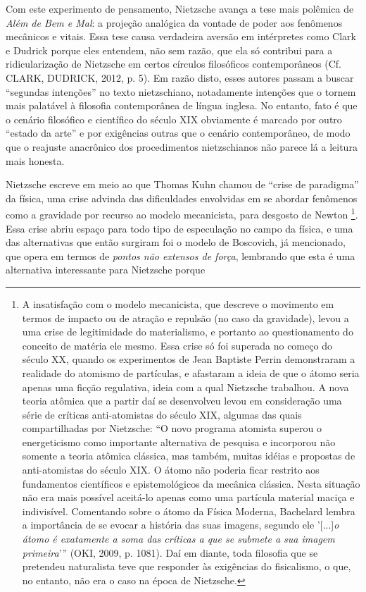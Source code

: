 \documentclass[
	12pt,				%
	openright,			%
	oneside,			%
	a4paper,			%
	english,			%
	french,				%
	spanish,			%
	brazil				%
	]{abntex2}
\begin{document}
Com este experimento de pensamento, Nietzsche avança a tese mais polêmica de \textit{Além de Bem e Mal}: a projeção analógica da vontade de poder aos fenômenos mecânicos e vitais. Essa tese causa verdadeira aversão em intérpretes como Clark e Dudrick porque eles entendem, não sem razão, que ela só contribui para a ridicularização de Nietzsche em certos círculos filosóficos contemporâneos (Cf. CLARK, DUDRICK, 2012, p. 5). Em razão disto, esses autores passam a buscar “segundas intenções” no texto nietzschiano, notadamente intenções que o tornem mais palatável à filosofia contemporânea de língua inglesa. No entanto, fato é que o cenário filosófico e científico do século XIX obviamente é marcado por outro “estado da arte” e por  exigências outras que o cenário contemporâneo, de modo que o reajuste anacrônico dos procedimentos nietzschianos não parece lá a leitura mais honesta.

	Nietzsche escreve em meio ao que Thomas Kuhn chamou de “crise de paradigma” da física, uma crise advinda das dificuldades envolvidas em se abordar fenômenos como a gravidade por recurso ao modelo mecanicista, para desgosto de Newton
\footnote{A insatisfação com o modelo mecanicista, que descreve o movimento em termos de impacto ou de atração e repulsão (no caso da gravidade), levou a uma crise de legitimidade do materialismo, e portanto ao questionamento do conceito de matéria ele mesmo. Essa crise só foi superada no começo do século XX, quando os experimentos de Jean Baptiste Perrin demonstraram a realidade do atomismo de partículas, e afastaram a ideia de que o átomo seria apenas uma ficção regulativa, ideia com a qual Nietzsche trabalhou. A nova teoria atômica que a partir daí se desenvolveu levou em consideração uma série de críticas anti-atomistas do século XIX, algumas das quais compartilhadas por Nietzsche: “O novo programa atomista superou o energeticismo como importante alternativa de pesquisa e incorporou não somente a teoria atômica clássica, mas também, muitas idéias e propostas de anti-atomistas do século XIX. O átomo não poderia ficar restrito aos fundamentos científicos e epistemológicos da mecânica clássica. Nesta situação não era mais possível aceitá-lo apenas como uma partícula material maciça e indivisível. Comentando sobre o átomo da Física Moderna, Bachelard lembra a importância de se evocar a história das suas imagens, segundo ele '[...]\textit{o átomo é exatamente a soma das críticas a que se submete a sua imagem primeira}'” (OKI, 2009, p. 1081). Daí em diante, toda filosofia que se pretendeu naturalista teve que responder às exigências do fisicalismo, o que, no entanto, não era o caso na época de Nietzsche.}. Essa crise abriu espaço para todo tipo de especulação no campo da física, e uma das alternativas que então surgiram foi o modelo de Boscovich, já mencionado, que opera em termos de \textit{pontos não extensos de força}, lembrando que esta é uma alternativa interessante para Nietzsche porque
\end{document}
